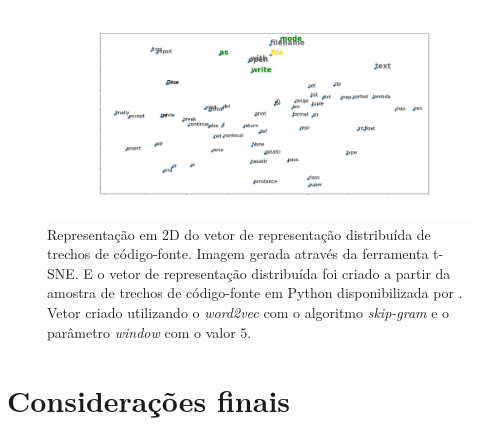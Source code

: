 \begin{figure}[h]
\includegraphics[width=1\textwidth]{figuras/cap-trabalhos-relacionados/code-tsne-output.png}
\caption{Representação em 2D do vetor de representação distribuída de trechos de código-fonte. Imagem gerada através da ferramenta t-SNE. E o vetor de representação distribuída foi criado a partir da amostra de trechos de código-fonte em Python disponibilizada por \cite{yao-2018}. Vetor criado utilizando o \textit{word2vec} com o algoritmo \textit{skip-gram} e o parâmetro \textit{window} com o valor $5$.}
\label{fig:tsne-code-snippet-python}
\end{figure}
  
  
\section{Considerações finais}

